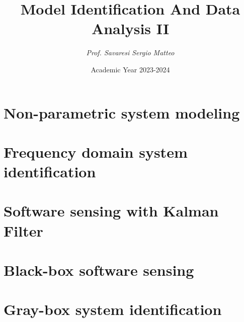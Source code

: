\documentclass[12pt, a4paper]{report}
\title{\textbf{Model Identification And Data Analysis II}}
\author{\textit{Prof. Savaresi Sergio Matteo}}
\date{Academic Year 2023-2024}
\begin{document}
    \maketitle

    

    \cleardoublepage{}

    \tableofcontents

    \cleardoublepage{}

    \chapter{Non-parametric system modeling}
    
    
    
    
    

    \chapter{Frequency domain system identification}
    
    
    
    
    

    \chapter{Software sensing with Kalman Filter}
    
    
    
    
    
    
    
    
    \chapter{Black-box software sensing}
    
    
    
    

    \chapter{Gray-box system identification}
    
    
    
\end{document}
